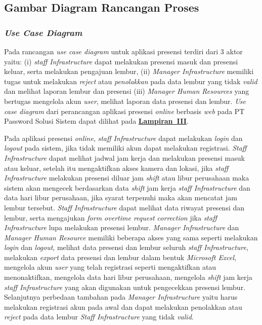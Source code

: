 \subsection{Gambar Diagram Rancangan Proses}
\subsubsection{\textit{Use Case Diagram}}
Pada rancangan \textit{use case diagram} untuk aplikasi presensi terdiri dari 3 aktor yaitu: (i) \textit{staff Infrastructure} dapat melakukan presensi masuk dan presensi keluar, serta melakukan pengajuan lembur, (ii) \textit{Manager Infrastructure} memiliki tugas untuk melakukan \textit{reject} atau \textit{penolakkan} pada data lembur yang tidak \textit{valid} dan melihat laporan lembur dan presensi (iii) \textit{Manager Human Resources} yang bertugas mengelola akun \textit{user}, melihat laporan data presensi dan lembur. \textit{Use case diagram} dari perancangan aplikasi presensi \textit{online} berbasis \textit{web} pada PT Password Solusi Sistem dapat dilihat pada \hyperref[sec:use-case-diagram-aplikasi-presensi-online]{\textbf{Lampiran~III}}.

Pada aplikasi presensi \textit{online}, \textit{staff Infrastructure} dapat melakukan \textit{login} dan \textit{logout} pada sistem, jika tidak memiliki akun dapat melakukan registrasi. \textit{Staff Infrastructure} dapat melihat jadwal jam kerja dan melakukan presensi masuk atau keluar, setelah itu mengaktifkan akses kamera dan lokasi, jika \textit{staff Infrastructure} melakukan presensi diluar jam \textit{shift} atau libur perusahaan maka sistem akan mengecek berdasarkan data \textit{shift} jam kerja \textit{staff Infrastructure} dan data hari libur perusahaan, jika syarat terpenuhi maka akan mencatat jam lembur tersebut. \textit{Staff Infrastructure} dapat melihat data riwayat presensi dan lembur, serta mengajukan \textit{form overtime request correction} jika \textit{staff Infrastructure} lupa melakukan presensi lembur. \textit{Manager Infrastructure} dan \textit{Manager Human Resource} memiliki beberapa akses yang sama seperti melakukan \textit{login} dan \textit{logout}, melihat data presensi dan lembur seluruh \textit{staff Infrastructure}, melakukan \textit{export} data presensi dan lembur dalam bentuk \textit{Microsoft Excel}, mengelola akun \textit{user} yang telah registrasi seperti mengaktifkan atau menonaktifkan, mengelola data hari libur perusahaan, mengelola \textit{shift} jam kerja \textit{staff Infrastructure} yang akan digunakan untuk pengecekkan presensi lembur. Selanjutnya perbedaan tambahan pada \textit{Manager Infrastructure} yaitu harus melakukan registrasi akun pada awal dan dapat melakukan penolakkan atau \textit{reject} pada data lembur \textit{Staff Infrastructure} yang tidak \textit{valid}.


